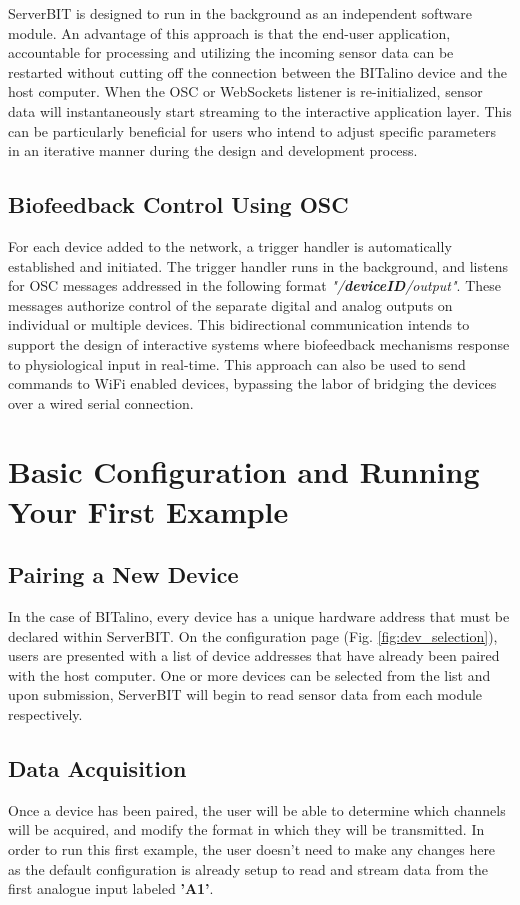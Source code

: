 ServerBIT is designed to run in the background as an independent software module. An advantage of this approach is that the end-user application, accountable for processing and utilizing the incoming sensor data can be restarted without cutting off the connection between the BITalino device and the host computer. When the OSC or WebSockets listener is re-initialized, sensor data will instantaneously start streaming to the interactive application layer. This can be particularly beneficial for users who intend to adjust specific parameters in an iterative manner during the design and development process.

\subsection{Biofeedback Control Using OSC} \label{Biofeedback}

For each device added to the network, a trigger handler is automatically established and initiated. The trigger handler runs in the background, and listens for OSC messages addressed in the following format \textit{"/\textbf{deviceID}/output"}. These messages authorize control of the separate digital and analog outputs on individual or multiple devices. This bidirectional communication intends to support the design of interactive systems where biofeedback mechanisms response to physiological input in real-time. This approach can also be used to send commands to WiFi enabled devices, bypassing the labor of bridging the devices over a wired serial connection.

\section{Basic Configuration and Running Your First Example}
\subsection{Pairing a New Device} \label{Pairing}
In the case of BITalino, every device has a unique hardware address that must be declared within ServerBIT. On the configuration page (Fig. \ref{fig:dev_selection}), users are presented with a list of device addresses that have already been paired with the host computer. One or more devices can be selected from the list and upon submission, ServerBIT will begin to read sensor data from each module respectively.

\subsection{Data Acquisition}
Once a device has been paired, the user will be able to determine which channels will be acquired, and modify the format in which they will be transmitted. In order to run this first example, the user doesn't need to make any changes here as the default configuration is already setup to read and stream data from the first analogue input labeled \textbf{'A1'}.

